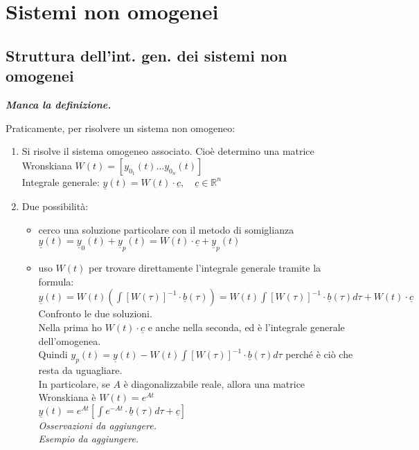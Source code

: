 \documentclass{scrreprt}
\begin{document}

\section{Sistemi non omogenei}
\subsection{Struttura dell'int. gen. dei sistemi non omogenei}
\begin{center}
	\emph{\textbf{Manca la definizione.}}
\end{center}

Praticamente, per risolvere un sistema non omogeneo:
\begin{enumerate}
	\item Si risolve il sistema omogeneo associato. Cioè determino una matrice Wronskiana $W(t) = \left[y_{0_1}(t)\ldots y_{0_n}(t)\right]$\\
			Integrale generale: $ \underline{y}(t) = W(t)\cdot \underline{c}, \quad \underline{c}\in\mathbb{R}^n$
	\item Due possibilità: \begin{itemize}
		\item cerco una soluzione particolare con il metodo di somiglianza \\ $\underline{y}(t) = \underline{y}_0(t) + \underline{y}_p(t) = W(t) \cdot \underline{c} + \underline{y}_p(t)$
		\item uso $W(t)$ per trovare direttamente l'integrale generale tramite la formula:\\$ \underline{y}(t) = W(t) \left(\int\left[W(\tau)\right]^{-1}\cdot \underline{b}(\tau)\right) = W(t) \int \left[W(\tau)\right]^{-1} \cdot \underline{b}(\tau) d\tau + W(t)\cdot \underline{c}$
		Confronto le due soluzioni.\\
		Nella prima ho $W(t)\cdot\underline{c}$ e anche nella seconda, ed è l'integrale generale dell'omogenea.\\
		Quindi $y_p(t) = \underline{y}(t) - W(t)\int \left[W(\tau)\right]^{-1} \cdot \underline{b}(\tau) d\tau$ perché è ciò che resta da uguagliare.\\
		In particolare, se $A$ è diagonalizzabile reale, allora una matrice Wronskiana è $W(t) = e^{At}$\\
		$\underline{y}(t) = e^{At} \left[\int e^{-At}\cdot \underline{b}(\tau) d\tau + \underline{c}\right] $\\
		\emph{Osservazioni da aggiungere.}\\
		\emph{Esempio da aggiungere.}	
	\end{itemize}



\end{enumerate}
\end{document}
